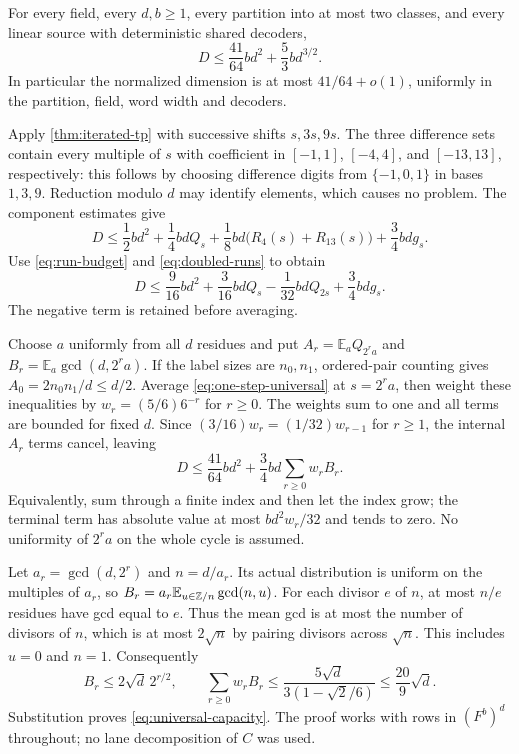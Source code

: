 \begin{theorem}\label{thm:universal-capacity}
For every field, every $d,b\ge1$, every partition into at most two classes,
and every linear source with deterministic shared decoders,
\begin{equation}\label{eq:universal-capacity}
 D\le\frac{41}{64}bd^2+\frac53 b d^{3/2}.
\end{equation}
In particular the normalized dimension is at most $41/64+o(1)$,
uniformly in the partition, field, word width and decoders.
\end{theorem}
\begin{outline}
Apply \cref{thm:iterated-tp} with successive shifts $s,3s,9s$.
The three difference sets contain every multiple of $s$ with coefficient
in $[-1,1]$, $[-4,4]$, and $[-13,13]$, respectively: this follows by
choosing difference digits from $\{-1,0,1\}$ in bases $1,3,9$.
Reduction modulo $d$ may identify elements, which causes no problem.
The component estimates give
\[
 D\le\frac12bd^2+\frac14bdQ_s+
 \frac18bd\bigl(R_4(s)+R_{13}(s)\bigr)+\frac34bdg_s.
\]
Use \eqref{eq:run-budget} and \eqref{eq:doubled-runs} to obtain
\begin{equation}\label{eq:one-step-universal}
 D\le\frac9{16}bd^2+\frac3{16}bdQ_s-\frac1{32}bdQ_{2s}
       +\frac34bdg_s.
\end{equation}
The negative term is retained before averaging.

Choose $a$ uniformly from all $d$ residues and put
$A_r=\mathbb E_a Q_{2^ra}$ and $B_r=\mathbb E_a\gcd(d,2^ra)$.
If the label sizes are $n_0,n_1$, ordered-pair counting gives
$A_0=2n_0n_1/d\le d/2$. Average \eqref{eq:one-step-universal} at
$s=2^ra$, then weight these inequalities by $w_r=(5/6)6^{-r}$ for
$r\ge0$. The weights sum to one and all terms are bounded for fixed
$d$. Since $(3/16)w_r=(1/32)w_{r-1}$ for $r\ge1$, the internal
$A_r$ terms cancel, leaving
\[
 D\le\frac{41}{64}bd^2+\frac34bd\sum_{r\ge0}w_r B_r.
\]
Equivalently, sum through a finite index and then let the index grow;
the terminal term has absolute value at most $bd^2w_r/32$ and tends to zero.
No uniformity of $2^ra$ on the whole cycle is assumed.

Let $a_r=\gcd(d,2^r)$ and $n=d/a_r$. Its actual distribution is uniform
on the multiples of $a_r$, so
$B_r=a_r\mathbb E_{u\in\mathbb{Z}/n}\gcd(n,u)$.
For each divisor $e$ of $n$, at most $n/e$ residues have gcd equal to
$e$. Thus the mean gcd is at most the number of divisors of $n$,
which is at most $2\sqrt n$ by pairing divisors across $\sqrt n$.
This includes $u=0$ and $n=1$. Consequently
\[
 B_r\le2\sqrt d\,2^{r/2},\qquad
 \sum_{r\ge0}w_rB_r\le
 \frac{5\sqrt d}{3(1-\sqrt2/6)}\le\frac{20}{9}\sqrt d.
\]
Substitution proves \eqref{eq:universal-capacity}. The proof works with
rows in $(F^b)^d$ throughout; no lane decomposition of $C$ was used.
\end{outline}

